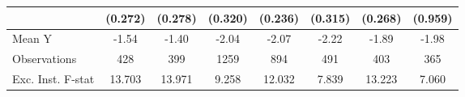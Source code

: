 {\begin{tabular}{l*{7}{c}}
            &     (0.272)         &     (0.278)         &     (0.320)         &     (0.236)         &     (0.315)         &     (0.268)         &     (0.959)         \\
\midrule
Mean Y      &       -1.54         &       -1.40         &       -2.04         &       -2.07         &       -2.22         &       -1.89         &       -1.98         \\
Observations&         428         &         399         &        1259         &         894         &         491         &         403         &         365         \\
Exc. Inst. F-stat&      13.703         &      13.971         &       9.258         &      12.032         &       7.839         &      13.223         &       7.060         \\
\bottomrule
\end{tabular}
}

